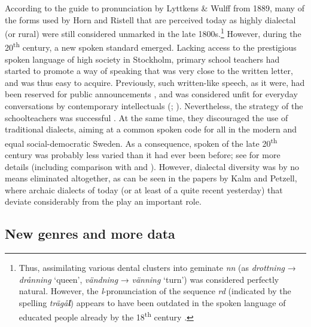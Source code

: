 \documentclass[output=paper]{langscibook}
\begin{document}
According to the guide to  pronunciation by Lyttkens \& Wulff from 1889, many of the forms used by Horn and Ristell that are perceived today as highly dialectal (or rural) were still considered unmarked in the late 1800s.\footnote{Thus, assimilating various dental clusters into geminate \textit{nn} (as \textit{drottning} → \textit{drånning} ‘queen’, \textit{vändning} → \textit{vänning} ‘turn’) was considered perfectly natural. However, the \textit{l}{}-pronunciation of the sequence \textit{rd} (indicated by the spelling \textit{trägå}\textbf{\textit{l}}) appears to have been outdated in the spoken language of educated people already by the 18\textsuperscript{th} century \citep{Hof1753}.} However, during the 20\textsuperscript{th} century, a new spoken standard emerged. Lacking access to the prestigious spoken language of high society in Stockholm, primary school teachers had started to promote a way of speaking that was very close to the written letter, and was thus easy to acquire. Previously, such written-like speech, as it were, had been reserved for public announcements \citep{Widmark1970}, and was considered unfit for everyday conversations by contemporary intellectuals (\citealt{Cederschiold1897}; \citealt{Noreen1903}). Nevertheless, the strategy of the schoolteachers was successful \citep{Widmark2000}. At the same time, they discouraged the use of traditional dialects, aiming at a common spoken code for all in the modern and equal social-democratic Sweden. As a consequence, spoken  of the late 20\textsuperscript{th} century was probably less varied than it had ever been before; see \citet{NilssonPetzell2015} for more details (including comparison with  and ). However, dialectal diversity was by no means eliminated altogether, as can be seen in the papers by Kalm and Petzell, where archaic dialects of today (or at least of a quite recent yesterday) that deviate considerably from the  play an important role.


\subsection{New genres and more data}\label{sec:intro:2.3}
\end{document}
